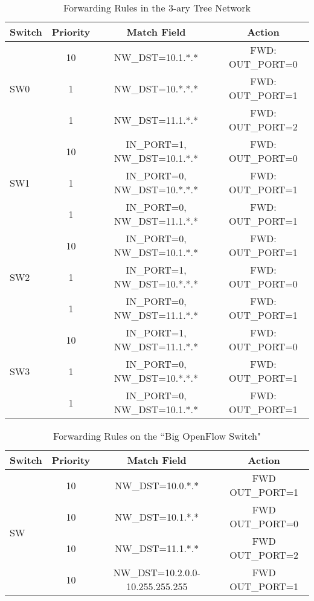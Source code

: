 \begin{table*}[t]
    \caption{Forwarding Rules in the 3-ary Tree Network}
    \begin{center}
        \begin{tabular}{lccc}
            \hline
            \hline
            Switch & Priority & Match Field & Action\\
            \hline
            \multirow{3}{2em}{SW0} & 10 & NW\_DST=10.1.*.* & FWD: OUT\_PORT=0 \\
                       & 1  & NW\_DST=10.*.*.* & FWD: OUT\_PORT=1 \\
                       & 1  & NW\_DST=11.1.*.* & FWD: OUT\_PORT=2 \\
            \multirow{3}{2em}{SW1} & 10 & IN\_PORT=1, NW\_DST=10.1.*.* & FWD: OUT\_PORT=0 \\
                       & 1  & IN\_PORT=0, NW\_DST=10.*.*.* & FWD: OUT\_PORT=1 \\
                       & 1  & IN\_PORT=0, NW\_DST=11.1.*.* & FWD: OUT\_PORT=1 \\
            \multirow{3}{2em}{SW2} & 10 & IN\_PORT=0, NW\_DST=10.1.*.* & FWD: OUT\_PORT=1 \\
                       & 1  & IN\_PORT=1, NW\_DST=10.*.*.* & FWD: OUT\_PORT=0 \\
                       & 1  & IN\_PORT=0, NW\_DST=11.1.*.* & FWD: OUT\_PORT=1 \\
            \multirow{3}{2em}{SW3} & 10 & IN\_PORT=1, NW\_DST=11.1.*.* & FWD: OUT\_PORT=0 \\
                       & 1  & IN\_PORT=0, NW\_DST=10.*.*.* & FWD: OUT\_PORT=1 \\
                       & 1  & IN\_PORT=0, NW\_DST=10.1.*.* & FWD: OUT\_PORT=1 \\
            \hline
        \end{tabular}
    \end{center}
    \label{OBS:Tab:OriginalFlowTable}
\end{table*}

\begin{table*}[t]
    \caption{Forwarding Rules on the ``Big OpenFlow Switch"}
    \begin{center}
        \begin{tabular}{lccc}
            \hline
            \hline
            Switch & Priority & Match Field & Action\\
            \hline
            \multirow{4}{2em}{SW}  & 10 & NW\_DST=10.0.*.* & FWD OUT\_PORT=1 \\
                       & 10 & NW\_DST=10.1.*.* & FWD OUT\_PORT=0 \\
                       & 10 & NW\_DST=11.1.*.* & FWD OUT\_PORT=2 \\
                       & 10 & NW\_DST=10.2.0.0-10.255.255.255 & FWD OUT\_PORT=1 \\
            \hline
        \end{tabular}
    \end{center}
    \label{OBS:Tab:CompressedFlowTable}
\end{table*}

